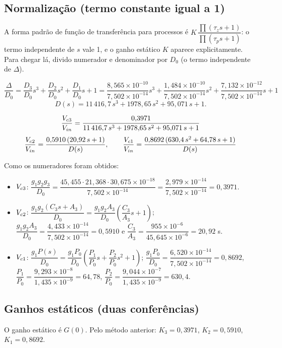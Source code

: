 \subsection{Normalização (termo constante igual a 1)}
\begin{just}A forma padrão de função de transferência para processos é $K\,\dfrac{\prod(\tau_{z}s+1)}{\prod(\tau_{p}s+1)}$: o termo independente de $s$ vale 1, e o ganho estático $K$ aparece explicitamente. Para chegar lá, divido numerador e denominador por $D_0$ (o termo independente de $\Delta$).\end{just}
\[
\frac{\Delta}{D_0}=\frac{D_3}{D_0}s^3+\frac{D_2}{D_0}s^2+\frac{D_1}{D_0}s+1=\frac{8{,}565\times10^{-10}}{7{,}502\times10^{-14}}s^3+\frac{1{,}484\times10^{-10}}{7{,}502\times10^{-14}}s^2+\frac{7{,}132\times10^{-12}}{7{,}502\times10^{-14}}s+1
\]
\[
D(s)=11\,416{,}7\,s^3+1978{,}65\,s^2+95{,}071\,s+1 .
\]
\begin{res}
\[\frac{V_{c3}}{V_{in}}=\frac{0{,}3971}{11\,416{,}7\,s^3+1978{,}65\,s^2+95{,}071\,s+1}\]
\[\frac{V_{c2}}{V_{in}}=\frac{0{,}5910\,(20{,}92\,s+1)}{D(s)},\qquad \frac{V_{c1}}{V_{in}}=\frac{0{,}8692\,(630{,}4\,s^2+64{,}78\,s+1)}{D(s)}\]
\end{res}
Como os numeradores foram obtidos:
\begin{itemize}
\item $V_{c3}$: $\dfrac{g_1g_2g_3}{D_0}=\dfrac{45{,}455\cdot21{,}368\cdot30{,}675\times10^{-18}}{7{,}502\times10^{-14}}=\dfrac{2{,}979\times10^{-14}}{7{,}502\times10^{-14}}=0{,}3971$.
\item $V_{c2}$: $\dfrac{g_1g_2(C_3s+A_3)}{D_0}=\dfrac{g_1g_2A_3}{D_0}\left(\dfrac{C_3}{A_3}s+1\right)$; $\dfrac{g_1g_2A_3}{D_0}=\dfrac{4{,}433\times10^{-14}}{7{,}502\times10^{-14}}=0{,}5910$ e $\dfrac{C_3}{A_3}=\dfrac{955\times10^{-6}}{45{,}645\times10^{-6}}=20{,}92$ s.
\item $V_{c1}$: $\dfrac{g_1P(s)}{D_0}=\dfrac{g_1P_0}{D_0}\left(\dfrac{P_1}{P_0}s+\dfrac{P_2}{P_0}s^2+1\right)$; $\dfrac{g_1P_0}{D_0}=\dfrac{6{,}520\times10^{-14}}{7{,}502\times10^{-14}}=0{,}8692$, $\dfrac{P_1}{P_0}=\dfrac{9{,}293\times10^{-8}}{1{,}435\times10^{-9}}=64{,}78$, $\dfrac{P_2}{P_0}=\dfrac{9{,}044\times10^{-7}}{1{,}435\times10^{-9}}=630{,}4$.
\end{itemize}

\subsection{Ganhos estáticos (duas conferências)}
O ganho estático é $G(0)$. Pelo método anterior: $K_3=0{,}3971$, $K_2=0{,}5910$, $K_1=0{,}8692$.

